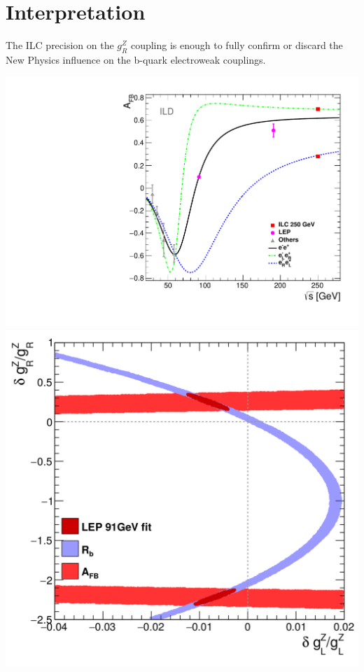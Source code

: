 

\section*{Interpretation}

The ILC precision on the $g_R^Z$ coupling is enough to fully confirm or discard the New Physics influence on the b-quark electroweak couplings. 
\begin{center}\vspace{0.5cm}
	
	\includegraphics[width=0.45\linewidth]{plots/afb-sqrts.pdf}
	\includegraphics[width=0.45\linewidth]{plots/lep-result-full.png}\\


\end{center}
